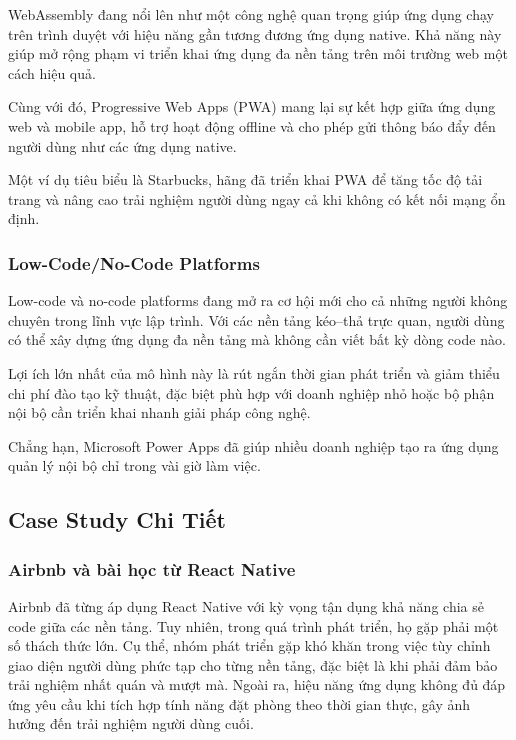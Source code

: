 \hspace*{1.5em}WebAssembly đang nổi lên như một công nghệ quan trọng giúp ứng dụng chạy trên trình duyệt với hiệu năng gần tương đương ứng dụng native.  
Khả năng này giúp mở rộng phạm vi triển khai ứng dụng đa nền tảng trên môi trường web một cách hiệu quả.

Cùng với đó, Progressive Web Apps (PWA) mang lại sự kết hợp giữa ứng dụng web và mobile app,  
hỗ trợ hoạt động offline và cho phép gửi thông báo đẩy đến người dùng như các ứng dụng native.

Một ví dụ tiêu biểu là Starbucks, hãng đã triển khai PWA để tăng tốc độ tải trang và nâng cao trải nghiệm người dùng ngay cả khi không có kết nối mạng ổn định.

\vspace{0.5cm}

\subsubsection{Low-Code/No-Code Platforms}

\hspace*{1.5em}Low-code và no-code platforms đang mở ra cơ hội mới cho cả những người không chuyên trong lĩnh vực lập trình.  
Với các nền tảng kéo–thả trực quan, người dùng có thể xây dựng ứng dụng đa nền tảng mà không cần viết bất kỳ dòng code nào.

Lợi ích lớn nhất của mô hình này là rút ngắn thời gian phát triển và giảm thiểu chi phí đào tạo kỹ thuật,  
đặc biệt phù hợp với doanh nghiệp nhỏ hoặc bộ phận nội bộ cần triển khai nhanh giải pháp công nghệ.

Chẳng hạn, Microsoft Power Apps đã giúp nhiều doanh nghiệp tạo ra ứng dụng quản lý nội bộ chỉ trong vài giờ làm việc.


\subsection{Case Study Chi Tiết}
\renewcommand{\labelitemi}{--}

\subsubsection{Airbnb và bài học từ React Native}

\hspace*{1.5em}Airbnb đã từng áp dụng React Native với kỳ vọng tận dụng khả năng chia sẻ code giữa các nền tảng.  
Tuy nhiên, trong quá trình phát triển, họ gặp phải một số thách thức lớn. Cụ thể, nhóm phát triển gặp khó khăn trong việc tùy chỉnh giao diện người dùng phức tạp cho từng nền tảng,  
đặc biệt là khi phải đảm bảo trải nghiệm nhất quán và mượt mà. Ngoài ra, hiệu năng ứng dụng không đủ đáp ứng yêu cầu khi tích hợp tính năng đặt phòng theo thời gian thực,  
gây ảnh hưởng đến trải nghiệm người dùng cuối.


